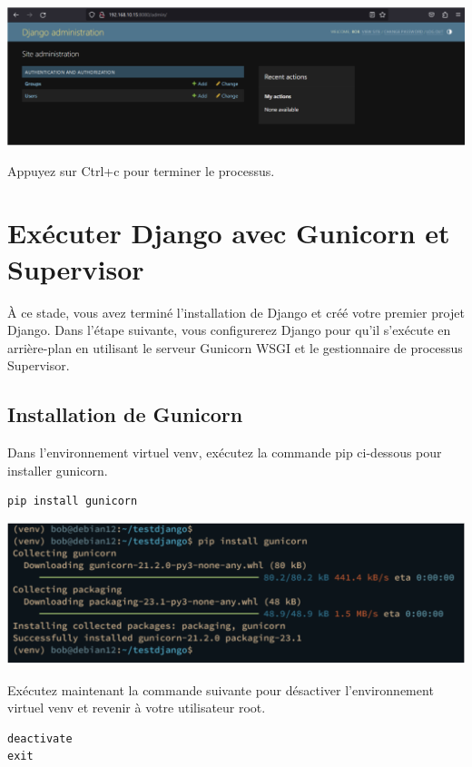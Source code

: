 \documentclass{article}
\begin{document}
\begin{center}
\includegraphics[width=15cm]{images/image19.png}
\end{center}

Appuyez sur Ctrl+c pour terminer le processus.

\section{Exécuter Django avec Gunicorn et Supervisor}
À ce stade, vous avez terminé l'installation de Django et créé votre premier projet Django. Dans l'étape suivante, vous configurerez Django pour qu'il s'exécute en arrière-plan en utilisant le serveur Gunicorn WSGI et le gestionnaire de processus Supervisor.
\subsection{Installation de Gunicorn}
Dans l'environnement virtuel venv, exécutez la commande pip ci-dessous pour installer gunicorn.
\begin{verbatim}
pip install gunicorn
\end{verbatim}

\begin{center}
\includegraphics[width=15cm]{images/image20.png}
\end{center}

Exécutez maintenant la commande suivante pour désactiver l'environnement virtuel venv et revenir à votre utilisateur root.

\begin{verbatim}
deactivate
exit
\end{verbatim}
\end{document}
